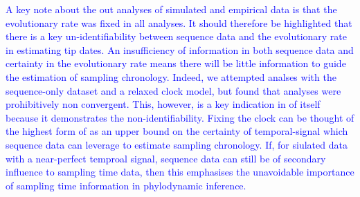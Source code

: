 \documentclass{article}
\begin{document}


\textcolor{blue}{A key note about the out analyses of simulated and empirical data is that the evolutionary rate was fixed in all analyses. It should therefore be highlighted that there is a key un-identifiability between sequence data and the evolutionary rate in estimating tip dates. An insufficiency of information in both sequence data and certainty in the evolutionary rate means there will be little information to guide the estimation of sampling chronology. Indeed, we attempted analses with the sequence-only dataset and a relaxed clock model, but found that analyses were prohibitively non convergent. This, however, is a key indication in of itself because it demonstrates the non-identifiability. Fixing the clock can be thought of the highest form of as an upper bound on the certainty of temporal-signal which sequence data can leverage to estimate sampling chronology. If, for siulated data with a near-perfect temproal signal, sequence data can still be of secondary influence to sampling time data, then this emphasises the unavoidable importance of sampling time information in phylodynamic inference.}

\end{document}
